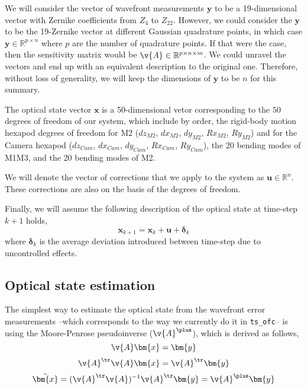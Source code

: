 \documentclass[SE,authoryear,toc]{lsstdoc}
\begin{document}
We will consider the vector of wavefront measurements $\bm{y}$ to be a 19-dimensional vector with Zernike coefficients from $Z_4$ to $Z_{22}$. However, we could consider the $\bm{y}$ to be the 19-Zernike vector at different Gaussian quadrature points, in which case $\bm{y} \in \mathbb{R}^{p \times n}$ where $p$ are the number of quadrature points. If that were the case, then the sensitivity matrix would be $\v{A} \in \mathbb{R}^{p \times n \times m}$. We could unravel the vectors and end up with an equivalent description to the original one. Therefore, without loss of generality, we will keep the dimensions of $\bm{y}$ to be $n$ for this summary.

The optical state vector  $\bm{x}$ is a 50-dimensional vetor corresponding to the $50$ degrees of freedom of our system, which include by order, the rigid-body motion hexapod degrees of freedom for M2 ($dz_{M2}$, $dx_{M2}$, $dy_{M2}$, $Rx_{M2}$, $Ry_{M2}$) and for the Camera hexapod ($dz_{Cam}$, $dx_{Cam}$, $dy_{Cam}$, $Rx_{Cam}$, $Ry_{Cam}$), the 20 bending modes of M1M3, and the 20 bending modes of M2. 

We will denote the vector of corrections that we apply to the system as $\bm{u} \in \mathbb{R}^n$. These corrections are also on the basis of the degrees of freedom.

Finally, we will assume the following description of the optical state at time-step $k + 1$ holds, 
\begin{equation}\label{eq3}
    \bm{x}_{k + 1} = \bm{x}_{k} + \bm{u} + \bm{\delta}_{k}
\end{equation}
where $\bm{\delta}_{k}$ is the average deviation introduced between time-step due to uncontrolled effects.

\subsection*{Optical state estimation}
The simplest way to estimate the optical state from the wavefront error measurements --which corresponds to the way we currently do it in \texttt{ts\_ofc}-- is using the Moore-Penrose pseudoinverse ($\v{A}^{\plus}$), which is derived as follows,
\begin{equation*}
     \v{A}\bm{x} = \bm{y}
\end{equation*}
\begin{equation*}
     \v{A}^{\tr}\v{A}\bm{x} = \v{A}^{\tr}\bm{y}
\end{equation*}
\begin{equation*}
    \hat{\bm{x}} = (\v{A}^{\tr} \v{A})^{-1}\v{A}^{\tr}\bm{y} = \v{A}^{\plus}\bm{y}
\end{equation*}
\end{document}
